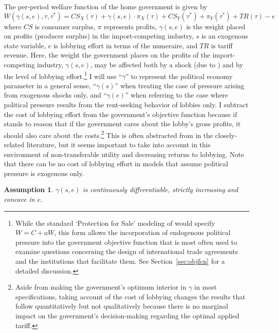 \documentclass[12pt]{article}
\newtheorem{assumption}{Assumption}
\newcommand{\ga}{\gamma}
\begin{document}
The per-period welfare function of the home government is given by
\begin{equation}
  W(\ga(s,e),\tau,\tau^*) = \mathit{CS}_X(\tau) + \ga(s,e) \cdot \pi_X(\tau) + \mathit{CS}_Y(\tau^*) + \pi_Y(\tau^*) + \mathit{TR}(\tau) - e
  \label{eq:wel}
\end{equation}
where $\mathit{CS}$ is consumer surplus, $\pi$ represents profits, $\ga(s,e)$ is the weight placed on profits (producer surplus) in the import-competing industry, $s$ is an exogenous state variable, $e$ is lobbying effort in terms of the numeraire, and $\mathit{TR}$ is tariff revenue. Here, the weight the government places on the profits of the import-competing industry, $\ga(s,e)$, may be affected both by a shock (due to \Textcite{ms2011}) and by the level of lobbying effort.\footnote{While the standard `Protection for Sale' modeling of \Textcite{gh94} would specify $W = C + aW$, this form allows the incorporation of endogenous political pressure into the government objective function that is most often used to examine questions concerning the design of international trade agreements and the institutions that facilitate them. See Section~\ref{sec:objfcn} for a detailed discussion.} I will use ``$\ga$'' to represent the political economy parameter in a general sense, ``$\ga(s)$'' when treating the case of pressure arising from exogenous shocks only, and ``$\ga(e)$'' when referring to the case where political pressure  results from the rent-seeking behavior of lobbies only. I subtract the cost of lobbying effort from the government's objective function because if stands to reason that if the government cares about the lobby's gross profits, it should also care about the costs.\footnote{Aside from making the government's optimum interior in $\ga$ in most specifications, taking account of the cost of lobbying changes the results that follow quantitatively but not qualitatively because there is no marginal impact on the government's decision-making regarding the optimal applied tariff.} This is often abstracted from in the closely-related literature, but it seems important to take into account in this environment of non-transferable utility and decreasing returns to lobbying. Note that there can be no cost of lobbying effort in models that assume political pressure is exogenous only.

\begin{assumption}
  $\ga(s,e)$ is continuously differentiable, strictly increasing and concave in $e$.
  \label{as:ga_c3}
\end{assumption}
\end{document}
